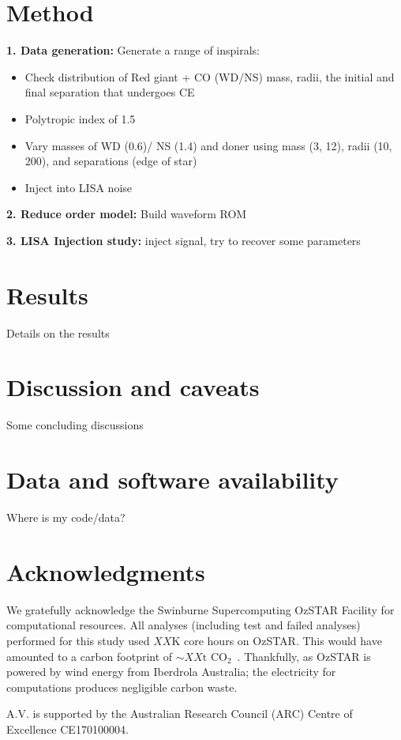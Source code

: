 \documentclass[floatfix,ApJL, twocolumn]{aastex631}
\begin{document}
\section{Method} \label{sec:method}


\textbf{1. Data generation:} Generate a range of inspirals:

\begin{itemize}
    \item Check distribution of Red giant + CO (WD/NS) mass, radii, the initial and final separation that undergoes CE 
    \item Polytropic index of 1.5 
    \item Vary masses of WD (0.6)/ NS (1.4) and doner using mass (3, 12), radii (10, 200), and separations (edge of star)
    \item Inject into LISA noise
\end{itemize}

\textbf{2. Reduce order model:} Build waveform ROM

\textbf{3. LISA Injection study:} inject signal, try to recover some parameters 













\section{Results}\label{sec:results}
Details on the results

\section{Discussion and caveats}\label{sec:conclusion}
Some concluding discussions

\section{Data and software availability}\label{sec:data}
Where is my code/data?






\section*{Acknowledgments}{


We gratefully acknowledge the Swinburne Supercomputing OzSTAR Facility for computational resources. All analyses (including test and failed analyses) performed for this study used $XX$K core hours on OzSTAR. This would have amounted to a carbon footprint of ${\sim XX{\text{t CO}_2}}$~\citep{greenhouse, energy_to_co2_converter}. Thankfully, as OzSTAR is powered by wind energy from Iberdrola Australia; the electricity for computations produces negligible carbon waste.


A.V. is supported by the Australian Research Council (ARC) Centre of Excellence CE170100004.

}
\end{document}
